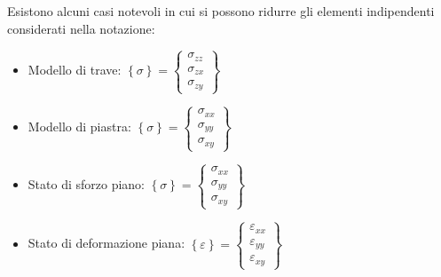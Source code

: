 Esistono alcuni casi notevoli in cui si possono ridurre gli elementi indipendenti considerati nella notazione:
\begin{itemize}
    \item Modello di trave: 
    $\left\{\sigma\right\} = \left\{
    \begin{array}{c}
    \sigma_{zz} \\ \sigma_{zx} \\ \sigma_{zy}
    \end{array}
    \right\}$

    \item Modello di piastra: 
    $\left\{\sigma\right\} = \left\{
    \begin{array}{c}
    \sigma_{xx} \\ \sigma_{yy} \\ \sigma_{xy}
    \end{array}
    \right\}$

    \item Stato di sforzo piano: 
    $\left\{\sigma\right\} = \left\{
    \begin{array}{c}
    \sigma_{xx} \\ \sigma_{yy} \\ \sigma_{xy}
    \end{array}
    \right\}$

    \item Stato di deformazione piana: 
    $\left\{\varepsilon\right\} = \left\{
    \begin{array}{c}
    \varepsilon_{xx} \\ \varepsilon_{yy} \\ \varepsilon_{xy}
    \end{array}
    \right\}$
\end{itemize}





